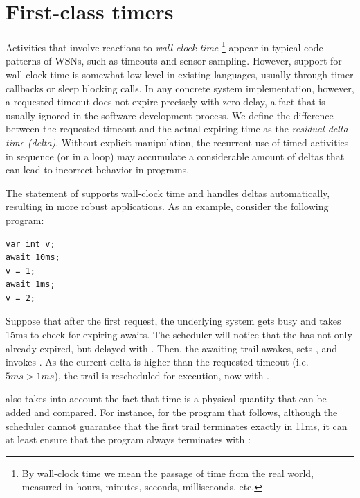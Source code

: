 \section{First-class timers}
\label{sec.ceu.wclocks}


Activities that involve reactions to \emph{wall-clock time}%
\footnote{
By wall-clock time we mean the passage of time from the real world, measured in 
hours, minutes, seconds, milliseconds, etc.
}
appear in typical code patterns of WSNs, such as timeouts and sensor sampling.
However, support for wall-clock time is somewhat low-level in existing 
languages, usually through timer callbacks or sleep blocking calls.
%
In any concrete system implementation, however, a requested timeout does not 
expire precisely with zero-delay, a fact that is usually ignored in the 
software development process.
We define the difference between the requested timeout and the actual expiring 
time as the \emph{residual delta time (delta)}.
Without explicit manipulation, the recurrent use of timed activities in 
sequence (or in a loop) may accumulate a considerable amount of deltas that can 
lead to incorrect behavior in programs.

The  statement of \CEU supports wall-clock time and handles deltas 
automatically, resulting in more robust applications.
As an example, consider the following program:

\nopagebreak
\noindent
\begin{minipage}{\linewidth}
\begin{lstlisting}[xleftmargin=2em]
var int v;
await 10ms;
v = 1;
await 1ms;
v = 2;
\end{lstlisting}
\end{minipage}

Suppose that after the first  request, the underlying system gets 
busy and takes 15ms to check for expiring awaits.
The \CEU scheduler will notice that the  has not only already 
expired, but delayed with .
Then, the awaiting trail awakes, sets , and invokes .
As the current delta is higher than the requested timeout (i.e. $5ms > 1ms$), 
the trail is rescheduled for execution, now with .

\CEU also takes into account the fact that time is a physical quantity that can 
be added and compared.
For instance, for the program that follows, although the scheduler cannot 
guarantee that the first trail terminates exactly in 11ms, it can at least 
ensure that the program always terminates with :

